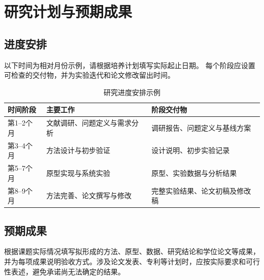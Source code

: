 \chapter{研究计划与预期成果}

\section{进度安排}
以下时间为相对月份示例，请根据培养计划填写实际起止日期。
每个阶段应设置可检查的交付物，并为实验迭代和论文修改留出时间。

\begin{table}[htbp]
  \centering
  \caption{研究进度安排示例}
  \label{tab:schedule}
  \begin{tabularx}{\linewidth}{@{}p{24mm}XX@{}}
    \toprule
    时间阶段 & 主要工作 & 阶段交付物 \\
    \midrule
    第1--2个月 & 文献调研、问题定义与需求分析 & 调研报告、问题定义与基线方案 \\
    第3--4个月 & 方法设计与初步验证 & 设计说明、初步实验记录 \\
    第5--7个月 & 原型实现与系统实验 & 原型、实验数据与分析结果 \\
    第8--9个月 & 方法完善、论文撰写与修改 & 完整实验结果、论文初稿及修改稿 \\
    \bottomrule
  \end{tabularx}
\end{table}

\section{预期成果}
根据课题实际情况填写拟形成的方法、原型、数据、研究结论和学位论文等成果，
并为每项成果说明验收方式。涉及论文发表、专利等计划时，应按实际要求和可行性表述，避免承诺尚无法确定的结果。
